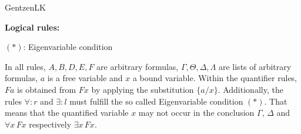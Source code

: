 \begin{entry}{GentzenLK}
\begin{calculus}


\textbf{Logical rules:}\\








$(*)$: Eigenvariable condition

\end{calculus}


 \begin{clarifications}
   In all rules, $A,B,D,E,F$ are arbitrary formulas, $\Gamma,\Theta,\Delta,\Lambda$ are lists of arbitrary formulas, $a$ is a free variable and $x$ a bound variable. Within the quantifier rules, $F a$ is obtained from $F x$ by applying the substitution $\{ a/x \} $. Additionally, the rules $\forall:r$ and $\exists:l$ must fulfill the so called Eigenvariable condition $(*)$. That means that the quantified variable $x$ may not occur in the conclusion $\Gamma$, $\Delta$ and $\forall x\, F x$ respectively $\exists x\, F x$.



\end{clarifications}
\end{entry}
